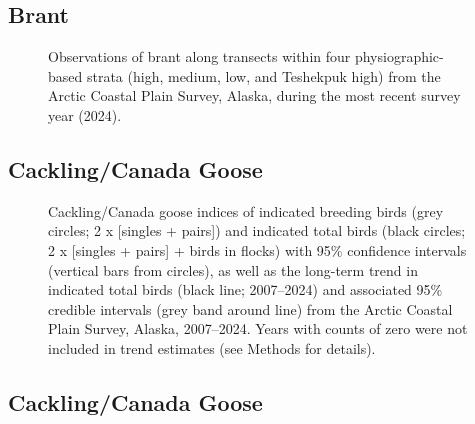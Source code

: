 \documentclass[
]{article}
\begin{document}
\endgroup{}

\newpage{}

\subsection*{Brant}\label{brant-2}

\begin{figure}


\caption{\label{fig-BRANmap}Observations of brant along transects within
four physiographic-based strata (high, medium, low, and Teshekpuk high)
from the Arctic Coastal Plain Survey, Alaska, during the most recent
survey year (2024).}

\end{figure}%

\newpage{}

\subsection*{Cackling/Canada Goose}\label{cacklingcanada-goose}

\begin{figure}


\caption{\label{fig-CCGO}Cackling/Canada goose indices of indicated
breeding birds (grey circles; 2 x {[}singles + pairs{]}) and indicated
total birds (black circles; 2 x {[}singles + pairs{]} + birds in flocks)
with 95\% confidence intervals (vertical bars from circles), as well as
the long-term trend in indicated total birds (black line; 2007--2024)
and associated 95\% credible intervals (grey band around line) from the
Arctic Coastal Plain Survey, Alaska, 2007--2024. Years with counts of
zero were not included in trend estimates (see Methods for details).}

\end{figure}%

\newpage{}

\subsection*{Cackling/Canada Goose}\label{cacklingcanada-goose-1}
\end{document}
